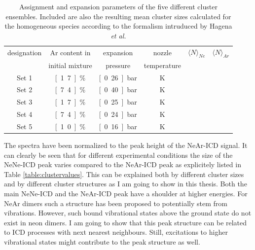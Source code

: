 \begin{table}[!h]
 \centering
 \caption{Assignment and expansion parameters of the five different
          cluster ensembles. Included are also the resulting mean
          cluster sizes calculated for the homogeneous species according
          to the formalism intruduced by Hagena \it{et al.}
          \cite{Hagena72}}
  \begin{tabular}{c c c c c c}
          \toprule
           designation    &       Ar content in   & expansion & nozzle & $\langle N\rangle _{Ne}$ & $\langle N\rangle _{Ar}$ \\
                                          &       initial mixture &  pressure & temperature & &  \\
          \midrule
          Set 1   &       \unit[1.7]{\%}  &       \unit[0.26]{bar}        &       \unit[63]{K}    &       \unit[5]        &       \unit[520]      \\
          Set 2   &       \unit[7.4]{\%}  &       \unit[0.40]{bar}        &       \unit[60]{K}    &       \unit[17]       &       \unit[1850] \\
          Set 3   &       \unit[1.7]{\%}  &       \unit[0.25]{bar}        &       \unit[57]{K}    &       \unit[7]        &       \unit[810]  \\
          Set 4   &       \unit[7.4]{\%}  &       \unit[0.24]{bar}        &       \unit[58]{K}    &       \unit[6]        &       \unit[670]  \\
          Set 5   &       \unit[1.0]{\%}  &       \unit[0.16]{bar}        &       \unit[54]{K}    &       \unit[3]        &       \unit[380]  \\
          \bottomrule
  \end{tabular}
\label{table:expansion_conditions}
\end{table}

The spectra have been normalized to the peak height of the NeAr-ICD signal.
It can clearly be seen that for different experimental conditions the
size of the NeNe-ICD peak varies compared to the NeAr-ICD peak as explicitely
listed in Table \ref{table:clustervalues}. This can be
explained both by different cluster sizes and by different cluster structures
as I am going to show in this thesis. Both the main NeNe-ICD and the NeAr-ICD peak
have a shoulder at higher energies. For NeAr dimers such a structure has
been proposed to potentially stem from vibrations. However, such bound vibrational
states above the ground state do not exist in neon dimers. I am going to show
that this peak structure can be related to \ac{ICD} processes with next nearest
neighbours. Still, excitations to higher vibrational states might contribute
to the peak structure as well.

